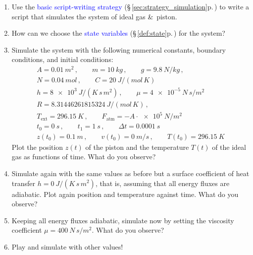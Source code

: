 \documentclass[a4paper,12pt,%
onecolumn,oneside,%
british%
]{memoir}
\newcommand*{\amp}{\&}
\newcommand*{\incr}{\Delta}%
\renewcommand*{\|}[1][]{\nonscript\:#1\vert\nonscript\:\mathopen{}}
\newcommand*{\sect}{\S}%
\renewcommand*{\autoref}[3][\sect\,\ref]{\textcolor{blue}{#3} {\color{blue}\scriptsize(\faIcon[regular]{eye}\;#1{#2}\;p.\,\pageref{#2})}}
\newcommand*{\yvis}{\mu} %
\newcommand*{\yhea}{h} %
\newcommand*{\yti}{t_{0}}
\newcommand*{\ytf}{t_{1}}
\newcommand*{\Dt}{\incr t}
\newcommand*{\yN}{N}
\newcommand*{\ym}{m}%
\newcommand*{\yFatm}{F_{\textrm{atm}}}
\newcommand*{\yT}{T}%
\newcommand*{\yTe}{\yT_{\text{ext}}}%
\begin{document}
\begin{exercise}
  \begin{enumerate}[exerc]
  \item Use the \autoref{sec:strategy_simulation}{basic script-writing strategy} to write a script that simulates the system of ideal gas \amp\ piston.
  \item How can we choose the \autoref{def:state}{state variables} for the system?
  \item Simulate the system with the following numerical constants, boundary conditions, and initial conditions:
    \begin{equation*}
      \begin{gathered}
        A = \qty{0.01}{m^{2}} \,,
        \qquad
        \ym = \qty{10}{kg} \,,
        \qquad
        g = \qty{9.8}{N/kg} \,,
        \\
        \yN = \qty{0.04}{mol} \,,
        \qquad
        C = \qty{20}{J/(mol\, K)}
        \\
        \yhea = \qty{8e3}{J/(K\, s\, m^{2})} \,,
        \qquad
        \yvis = \qty{4e-5}{N\,s/m^{2}}
        \\
        R = \qty{8.31446261815324}{J/(mol\, K)} \,,
        \\
        \yTe = \qty{296.15}{K} \,,
        \qquad
        \yFatm = - A\cdot\qty{e5}{N/m^{2}}
        \\
        \yti = \qty{0}{s} \,,
        \qquad
        \ytf = \qty{1}{s} \,,
        \qquad
        \Dt = \qty{0.0001}{s}
        \\
        z(\yti) = \qty{0.1}{m} \,,
        \qquad
        v(\yti) = \qty{0}{m/s} \,,
        \qquad
        \yT(\yti) = \qty{296.15}{K}
      \end{gathered}
    \end{equation*}
    Plot the position $z(t)$ of the piston and the temperature $\yT(t)$ of the ideal gas as functions of time. What do you observe?
  \item Simulate again with the same values as before but a surface coefficient of heat transfer $\yhea=\qty{0}{J/(K\,s\,m^{2})}$, that is, assuming that all energy fluxes are adiabatic. Plot again position and temperature against time. What do you observe?
  \item Keeping all energy fluxes adiabatic, simulate now by setting the viscosity coefficient $\yvis = \qty{400}{N\,s/m^{2}}$. What do you observe?

  \item Play and simulate with other values!
  \end{enumerate}
\end{exercise}
\end{document}
